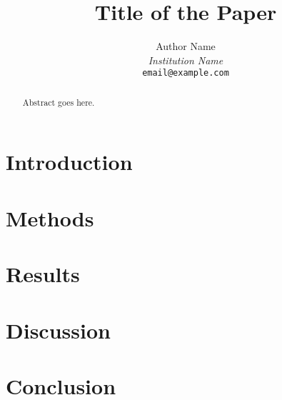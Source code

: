 \documentclass[11pt]{article}
\title{Title of the Paper}
\author{Author Name \\
\textit{Institution Name} \\
\texttt{email@example.com}}
\date{}
\begin{document}
\maketitle

\begin{abstract}
\noindent
Abstract goes here. \lipsum[1]
\end{abstract}

\section{Introduction}
\lipsum[2-3]

\section{Methods}
\lipsum[4]

\section{Results}
\lipsum[5]

\section{Discussion}
\lipsum[6]

\section{Conclusion}
\lipsum[7]



\end{document}
